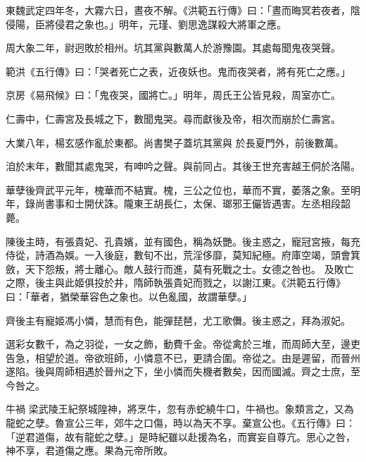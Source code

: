 \begin{pinyinscope}
 東魏武定四年冬，大霧六日，晝夜不解。《洪範五行傳》曰：「晝而晦冥若夜者，陰侵陽，臣將侵君之象也。」明年，元瑾、劉思逸謀殺大將軍之應。



 周大象二年，尉迥敗於相州。坑其黨與數萬人於游豫園。其處每聞鬼夜哭聲。



 範洪《五行傳》曰：「哭者死亡之表，近夜妖也。鬼而夜哭者，將有死亡之應。」



 京房《易飛候》曰：「鬼夜哭，國將亡。」明年，周氏王公皆見殺，周室亦亡。



 仁壽中，仁壽宮及長城之下，數聞鬼哭。尋而獻後及帝，相次而崩於仁壽宮。



 大業八年，楊玄感作亂於東都。尚書樊子蓋坑其黨與
 於長夏門外，前後數萬。



 洎於末年，數聞其處鬼哭，有呻吟之聲。與前同占。其後王世充害越王侗於洛陽。



 華孽後齊武平元年，槐華而不結實。槐，三公之位也，華而不實，萎落之象。至明年，錄尚書事和士開伏誅。隴東王胡長仁，太保、瑯邪王儼皆遇害。左丞相段韶薨。



 陳後主時，有張貴妃、孔貴嬪，並有國色，稱為妖艷。後主惑之，寵冠宮掖，每充侍從，詩酒為娛。一入後庭，數旬不出，荒淫侈靡，莫知紀極。府庫空竭，頭會箕斂，天下怨叛，將士離心。敵人鼓行而進，莫有死戰之士。女德之咎也。
 及敗亡之際，後主與此姬俱投於井，隋師執張貴妃而戮之，以謝江東。《洪範五行傳》曰：「華者，猶榮華容色之象也。以色亂國，故謂華孽。」



 齊後主有寵姬馮小憐，慧而有色，能彈琵琶，尤工歌儛。後主惑之，拜為淑妃。



 選彩女數千，為之羽從，一女之飾，動費千金。帝從禽於三堆，而周師大至，邊吏告急，相望於道。帝欲班師，小憐意不已，更請合圍。帝從之。由是遲留，而晉州遂陷。後與周師相遇於晉州之下，坐小憐而失機者數矣，因而國滅。齊之士庶，至今咎之。



 牛禍
 梁武陵王紀祭城隍神，將烹牛，忽有赤蛇繞牛口，牛禍也。象類言之，又為龍蛇之孽。魯宣公三年，郊牛之口傷，時以為天不享。棄宣公也。《五行傳》曰：「逆君道傷，故有龍蛇之孽。」是時紀雖以赴援為名，而實妄自尊亢。思心之咎，神不享，君道傷之應。果為元帝所敗。




\end{pinyinscope}
